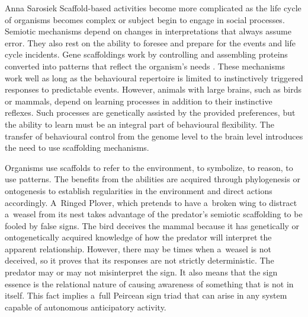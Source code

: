 \begin{artengenv}{Anna Sarosiek}
Scaffold-based activities become more complicated as the life cycle of organisms becomes complex or subject begin to engage in social processes. Semiotic mechanisms depend on changes in interpretations that always assume error. They also rest on the ability to foresee and prepare for the events and life cycle incidents. Gene scaffoldings work by controlling and assembling proteins converted into patterns that reflect the organism’s needs
\parencite[][]{hoffmeyer_semiome_2014}. %
 These mechanisms work well as long as the behavioural repertoire is limited to instinctively triggered responses to predictable events. However, animals with large brains, such as birds or mammals, depend on learning processes in addition to their instinctive reflexes. Such processes are genetically assisted by the provided preferences, but the ability to learn must be an integral part of behavioural flexibility. The transfer of behavioural control from the genome level to the brain level introduces the need to use scaffolding mechanisms.

Organisms use scaffolds to refer to the environment, to symbolize, to reason, to use patterns. The benefits from the abilities are acquired through phylogenesis or ontogenesis to establish regularities in the environment and direct actions accordingly. A~Ringed Plover, which pretends to have a~broken wing to distract a~weasel from its nest takes advantage of the predator’s semiotic scaffolding to be fooled by false signs. The bird deceives the mammal because it has genetically or ontogenetically acquired knowledge of how the predator will interpret the apparent relationship. However, there may be times when a~weasel is not deceived, so it proves that its responses are not strictly deterministic. The predator may or may not misinterpret the sign. It also means that the sign essence is the relational nature of causing awareness of something that is not in itself. This fact implies a~full Peircean sign triad that can arise in any system capable of autonomous anticipatory activity.


\end{artengenv}

